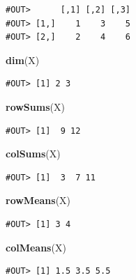 \documentclass[]{book}
\newenvironment{Shaded}{\begin{snugshade}}{\end{snugshade}}
\newcommand{\KeywordTok}[1]{\textcolor[rgb]{0.13,0.29,0.53}{\textbf{#1}}}
\newcommand{\NormalTok}[1]{#1}
\theoremstyle{definition}
\theoremstyle{definition}
\theoremstyle{definition}
\theoremstyle{remark}
\begin{document}
\begin{verbatim}
#OUT>      [,1] [,2] [,3]
#OUT> [1,]    1    3    5
#OUT> [2,]    2    4    6
\end{verbatim}

\begin{Shaded}
\begin{Highlighting}[]
\KeywordTok{dim}\NormalTok{(X)}
\end{Highlighting}
\end{Shaded}

\begin{verbatim}
#OUT> [1] 2 3
\end{verbatim}

\begin{Shaded}
\begin{Highlighting}[]
\KeywordTok{rowSums}\NormalTok{(X)}
\end{Highlighting}
\end{Shaded}

\begin{verbatim}
#OUT> [1]  9 12
\end{verbatim}

\begin{Shaded}
\begin{Highlighting}[]
\KeywordTok{colSums}\NormalTok{(X)}
\end{Highlighting}
\end{Shaded}

\begin{verbatim}
#OUT> [1]  3  7 11
\end{verbatim}

\begin{Shaded}
\begin{Highlighting}[]
\KeywordTok{rowMeans}\NormalTok{(X)}
\end{Highlighting}
\end{Shaded}

\begin{verbatim}
#OUT> [1] 3 4
\end{verbatim}

\begin{Shaded}
\begin{Highlighting}[]
\KeywordTok{colMeans}\NormalTok{(X)}
\end{Highlighting}
\end{Shaded}

\begin{verbatim}
#OUT> [1] 1.5 3.5 5.5
\end{verbatim}
\end{document}

